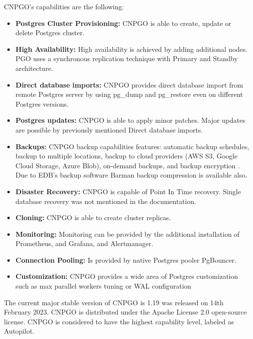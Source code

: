 CNPGO’s capabilities are the following:
\begin{itemize}
  \item \textbf{Postgres Cluster Provisioning:} CNPGO is able to create, update or delete Postgres cluster. \cite{CNPGdocuCapabilityLevels}
  \item \textbf{High Availability:} High availability is achieved by adding additional nodes. PGO uses a synchronous replication technique with Primary and Standby architecture. \cite{CNPGdocuReplication}
  \item \textbf{Direct database imports:} CNPGO provides direct database import from remote Postgres server by using pg\_dump and pg\_restore even on different Postgres versions. \cite{CNPGdocuDatabaseImports}
  \item \textbf{Postgres updates:} CNPGO is able to apply minor patches. \cite{CNPGdocuUpdates} Major updates are possible by previously mentioned Direct database imports.
  \item \textbf{Backups:} CNPGO backup capabilities features: automatic backup schedules, backup to multiple locations, backup to cloud providers (AWS S3, Google Cloud Storage, Azure Blob), on-demand backups, and backup encryption \cite{CNPGdocuBackup}\cite{CNPGdocuTDE}. Due to EDB’s backup software Barman backup compression is available also. \cite{CNPGdocuBackup}
  \item \textbf{Disaster Recovery:} CNPGO is capable of Point In Time recovery. Single database recovery was not mentioned in the documentation. \cite{CNPGdocuBackup}
  \item \textbf{Cloning:} CNPGO is able to create cluster replicas. \cite{CNPGdocuReplication}
  \item \textbf{Monitoring:} Monitoring can be provided by the additional installation of Prometheus, and Grafana, and Alertmanager. \cite{CNPGdocuQuickstart}
  \item \textbf{Connection Pooling:} Is provided by native Postgres pooler PgBouncer. \cite{CNPGdocuConnectionPooling}
  \item \textbf{Customization:} CNPGO provides a wide area of Postgres customization such as max parallel workers tuning or WAL configuration \cite{CNPGdocuConfiguration}
\end{itemize}

The current major stable version of CNPGO is 1.19 was released on 14th February 2023. CNPGO is distributed under the Apache License 2.0 open-source license. CNPGO is considered to have the highest capability level, labeled as Autopilot. \cite{CNPGdocu}


